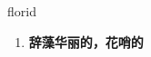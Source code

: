 
\begin{frame}
{\huge florid}
\begin{center}
\begin{enumerate}\Large
  \item \textbf{辞藻华丽的，花哨的}
\end{enumerate}
\end{center}
\end{frame}
